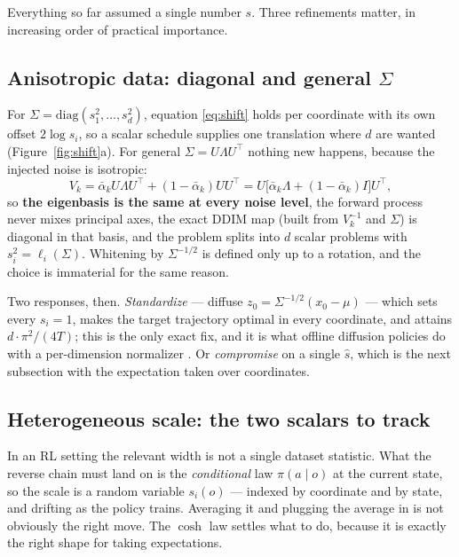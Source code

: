 \documentclass[11pt]{article}
\theoremstyle{definition}
\newcommand{\abar}{\bar\alpha}
\begin{document}
Everything so far assumed a single number $s$. Three refinements matter, in
increasing order of practical importance.

\subsection{Anisotropic data: diagonal and general $\Sigma$}

For $\Sigma=\mathrm{diag}(s_1^2,\dots,s_d^2)$, equation \eqref{eq:shift} holds
per coordinate with its own offset $2\log s_i$, so a scalar schedule supplies one
translation where $d$ are wanted (Figure~\ref{fig:shift}a). For general
$\Sigma=U\Lambda U^{\!\top}$ nothing new happens, because the injected noise is
isotropic:
\begin{equation}
  V_k=\abar_kU\Lambda U^{\!\top}+(1-\abar_k)UU^{\!\top}
     =U\big[\abar_k\Lambda+(1-\abar_k)I\big]U^{\!\top},
  \label{eq:eig}
\end{equation}
so \textbf{the eigenbasis is the same at every noise level}, the forward process
never mixes principal axes, the exact DDIM map (built from $V_k^{-1}$ and
$\Sigma$) is diagonal in that basis, and the problem splits into $d$ scalar
problems with $s_i^2=\ell_i(\Sigma)$. Whitening by $\Sigma^{-1/2}$ is defined
only up to a rotation, and the choice is immaterial for the same reason.

Two responses, then. \emph{Standardize} --- diffuse
$z_0=\Sigma^{-1/2}(x_0-\mu)$ --- which sets every $s_i=1$, makes the target
trajectory optimal in every coordinate, and attains $d\cdot\pi^2/(4T)$; this is
the only exact fix, and it is what offline diffusion policies do with a
per-dimension normalizer \cite{chi2023diffusion}. Or \emph{compromise} on a
single $\hat s$, which is the next subsection with the expectation taken over
coordinates.

\subsection{Heterogeneous scale: the two scalars to track}
\label{sec:hetero}

In an RL setting the relevant width is not a single dataset statistic. What the
reverse chain must land on is the \emph{conditional} law $\pi(a\mid o)$ at the
current state, so the scale is a random variable $s_i(o)$ --- indexed by
coordinate and by state, and drifting as the policy trains. Averaging it and
plugging the average in is not obviously the right move. The $\cosh$ law settles
what to do, because it is exactly the right shape for taking expectations.
\end{document}
